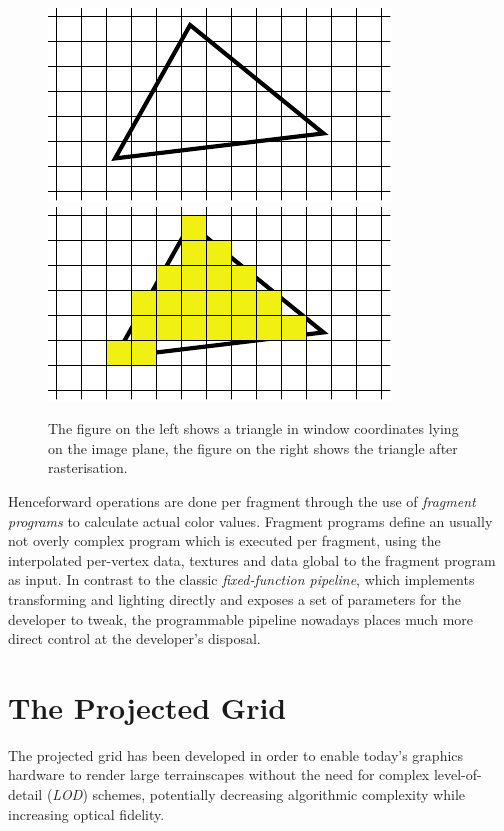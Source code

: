 \begin{figure}
\centering
\subfigure
{
  \includegraphics[scale=1.0]{Images/Rasteriser1.pdf}
  \label{fig:subfigrasteriser1}
}
\subfigure
{
  \includegraphics[scale=1.0]{Images/Rasteriser2.pdf}
  \label{fig:subfigrasteriser2}
}
\caption[Triangle Rasterisation]{The figure on the left shows a triangle in
window coordinates lying on the image plane, the figure on the right shows the
triangle after rasterisation.}
\label{fig:rasteriser}
\end{figure}

Henceforward operations are done per fragment through the use of
\textit{fragment programs} to calculate actual color values. Fragment programs
define an usually not overly complex program which is executed per fragment,
using the interpolated per-vertex data, textures and data global to the fragment
program as input. In contrast to the classic \textit{fixed-function pipeline},
which implements transforming and lighting directly and exposes a set of
parameters for the developer to tweak, the programmable pipeline nowadays places
much more direct control at the developer's disposal.

\section{The Projected Grid}
The projected grid has been developed in order to enable today's graphics
hardware to render large terrainscapes without the need for complex
level-of-detail (\textit{LOD}) schemes, potentially decreasing algorithmic
complexity while increasing optical fidelity.

